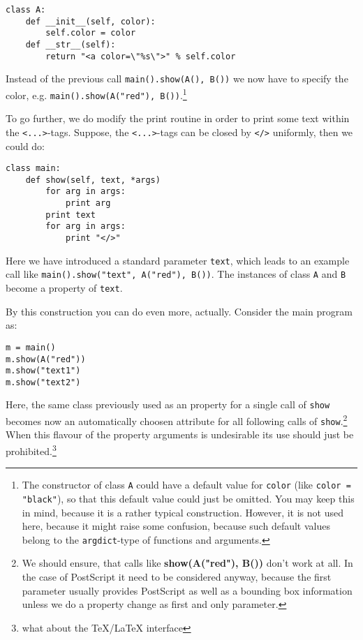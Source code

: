 \documentclass{article}
\begin{document}
\begin{verbatim}
class A:
    def __init__(self, color):
        self.color = color
    def __str__(self):
        return "<a color=\"%s\">" % self.color
\end{verbatim}

Instead of the previous call \verb|main().show(A(), B())| we now have
to specify the color, e.g.
\verb|main().show(A("red"), B())|.\footnote{The constructor of class
\texttt{A} could have a default value for \texttt{color} (like
\texttt{color = "black"}), so that this default value could just be
omitted. You may keep this in mind, because it is a rather typical
construction. However, it is not used here, because it might raise
some confusion, because such default values belong to the
\texttt{argdict}-type of functions and arguments.}

To go further, we do modify the print routine in order to print some
text within the \verb|<...>|-tags. Suppose, the \verb|<...>|-tags can
be closed by \verb|</>| uniformly, then we could do:

\begin{verbatim}
class main:
    def show(self, text, *args)
        for arg in args:
            print arg
        print text
        for arg in args:
            print "</>"
\end{verbatim}

Here we have introduced a standard parameter \verb|text|, which leads
to an example call like \verb|main().show("text", A("red"), B())|. The
instances of class \verb|A| and \verb|B| become a property of
\verb|text|.

By this construction you can do even more, actually.
Consider the main program as:

\begin{verbatim}
m = main()
m.show(A("red"))
m.show("text1")
m.show("text2")
\end{verbatim}

Here, the same class previously used as an property for a single
call of \verb|show| becomes now an automatically choosen attribute for
all following calls of \verb|show|.\footnote{We should ensure, that
calls like \textbf{show(A("red"), B())} don't work at all. In the case
of PostScript it need to be considered anyway, because the first
parameter usually provides PostScript as well as a bounding box
information unless we do a property change as first and only
parameter.} When this flavour of the property arguments is undesirable
its use should just be prohibited.\footnote{what about the
\TeX/\LaTeX{} interface}
\end{document}
